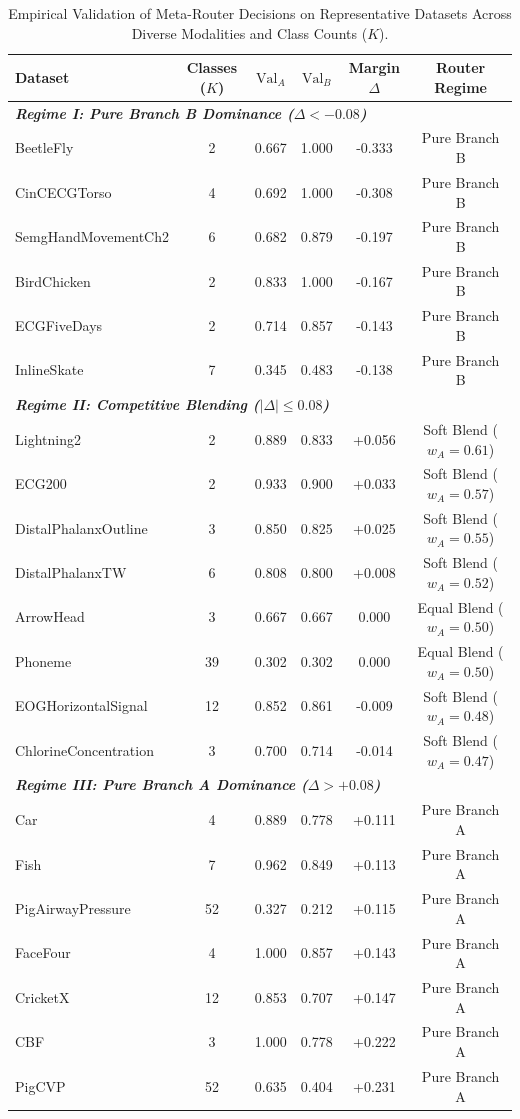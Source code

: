 \begin{table}[t]
\centering
\caption{Empirical Validation of Meta-Router Decisions on Representative Datasets Across Diverse Modalities and Class Counts ($K$).}
\label{tab:routing_sample}
\small
\begin{tabular}{lccccc}
\toprule
\textbf{Dataset} & \textbf{Classes ($K$)} & \textbf{$\text{Val}_A$} & \textbf{$\text{Val}_B$} & \textbf{Margin $\Delta$} & \textbf{Router Regime} \\
\midrule
\multicolumn{6}{l}{\textit{\textbf{Regime I: Pure Branch B Dominance ($\Delta < -0.08$)}}} \\
BeetleFly & 2 & 0.667 & 1.000 & -0.333 & Pure Branch B \\
CinCECGTorso & 4 & 0.692 & 1.000 & -0.308 & Pure Branch B \\
SemgHandMovementCh2 & 6 & 0.682 & 0.879 & -0.197 & Pure Branch B \\
BirdChicken & 2 & 0.833 & 1.000 & -0.167 & Pure Branch B \\
ECGFiveDays & 2 & 0.714 & 0.857 & -0.143 & Pure Branch B \\
InlineSkate & 7 & 0.345 & 0.483 & -0.138 & Pure Branch B \\
\midrule
\multicolumn{6}{l}{\textit{\textbf{Regime II: Competitive Blending ($|\Delta| \le 0.08$)}}} \\
Lightning2 & 2 & 0.889 & 0.833 & +0.056 & Soft Blend ($w_A=0.61$) \\
ECG200 & 2 & 0.933 & 0.900 & +0.033 & Soft Blend ($w_A=0.57$) \\
DistalPhalanxOutline & 3 & 0.850 & 0.825 & +0.025 & Soft Blend ($w_A=0.55$) \\
DistalPhalanxTW & 6 & 0.808 & 0.800 & +0.008 & Soft Blend ($w_A=0.52$) \\
ArrowHead & 3 & 0.667 & 0.667 & 0.000 & Equal Blend ($w_A=0.50$) \\
Phoneme & 39 & 0.302 & 0.302 & 0.000 & Equal Blend ($w_A=0.50$) \\
EOGHorizontalSignal & 12 & 0.852 & 0.861 & -0.009 & Soft Blend ($w_A=0.48$) \\
ChlorineConcentration & 3 & 0.700 & 0.714 & -0.014 & Soft Blend ($w_A=0.47$) \\
\midrule
\multicolumn{6}{l}{\textit{\textbf{Regime III: Pure Branch A Dominance ($\Delta > +0.08$)}}} \\
Car & 4 & 0.889 & 0.778 & +0.111 & Pure Branch A \\
Fish & 7 & 0.962 & 0.849 & +0.113 & Pure Branch A \\
PigAirwayPressure & 52 & 0.327 & 0.212 & +0.115 & Pure Branch A \\
FaceFour & 4 & 1.000 & 0.857 & +0.143 & Pure Branch A \\
CricketX & 12 & 0.853 & 0.707 & +0.147 & Pure Branch A \\
CBF & 3 & 1.000 & 0.778 & +0.222 & Pure Branch A \\
PigCVP & 52 & 0.635 & 0.404 & +0.231 & Pure Branch A \\
\bottomrule
\end{tabular}
\end{table}
